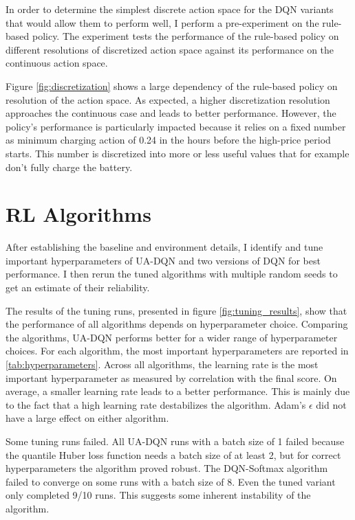 In order to determine the simplest discrete action space for the DQN variants that would allow them to perform well, I perform a pre-experiment on the rule-based policy.
The experiment tests the performance of the rule-based policy on different resolutions of discretized action space against its performance on the continuous action space.

Figure \ref{fig:discretization} shows a large dependency of the rule-based policy on resolution of the action space.
As expected, a higher discretization resolution approaches the continuous case and leads to better performance.
However, the policy's performance is particularly impacted because it relies on a fixed number as minimum charging action of 0.24 in the hours before the high-price period starts.
This number is discretized into more or less useful values that for example don't fully charge the battery.


\section{RL Algorithms}
After establishing the baseline and environment details, I identify and tune important hyperparameters of UA-DQN and two versions of DQN for best performance.
I then rerun the tuned algorithms with multiple random seeds to get an estimate of their reliability.

The results of the tuning runs, presented in figure \ref{fig:tuning_results}, show that the performance of all algorithms depends on hyperparameter choice.
Comparing the algorithms, UA-DQN performs better for a wider range of hyperparameter choices.
For each algorithm, the most important hyperparameters are reported in \ref{tab:hyperparameters}.
Across all algorithms, the learning rate is the most important hyperparameter as measured by correlation with the final score.
On average, a smaller learning rate leads to a better performance.
This is mainly due to the fact that a high learning rate destabilizes the algorithm.
Adam's $\epsilon$ did not have a large effect on either algorithm.

Some tuning runs failed. All UA-DQN runs with a batch size of 1 failed because the quantile Huber loss function needs a batch size of at least 2, but for correct hyperparameters the algorithm proved robust.
The DQN-Softmax algorithm failed to converge on some runs with a batch size of 8. Even the tuned variant only completed 9/10 runs. This suggests some inherent instability of the algorithm.


